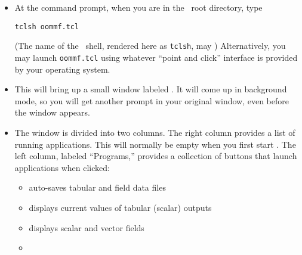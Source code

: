 \begin{list}{}{\setlength{\labelwidth}{0pt}
               \setlength{\leftmargin}{0pt}
               \setlength{\rightmargin}{\leftmargin}
               \setlength{\itemsep}{0pt}}
  \item {}
  \begin{itemize}
    \item At the command prompt, when you are in the \OOMMF\ root
          directory, type 
\begin{verbatim}
tclsh oommf.tcl
\end{verbatim}
    (The name of the \Tcl\ shell, rendered here as \verb+tclsh+, may
    )
    Alternatively, you may launch \verb+oommf.tcl+ using
    whatever ``point and click'' interface is provided by your operating
    system.
    \item This will bring up a small window labeled
          . It will come up in background mode, so you will get
          another prompt in your original window, even before the
           window appears.
  \end{itemize}
  \item {}
  \begin{itemize}
  \item The  window is divided into two columns. The
    right column provides a list of running applications. This will
    normally be empty when you first start . The
      left column, labeled ``Programs,'' provides a collection of
      buttons that launch applications when clicked:
    \begin{itemize}
       \item {}
                   auto-saves tabular and field data files
       \item {}
                   displays current values of tabular (scalar) outputs
       \item {}
                   displays scalar and vector fields
       \item {}

\end{itemize}
\end{itemize}
\end{list}
